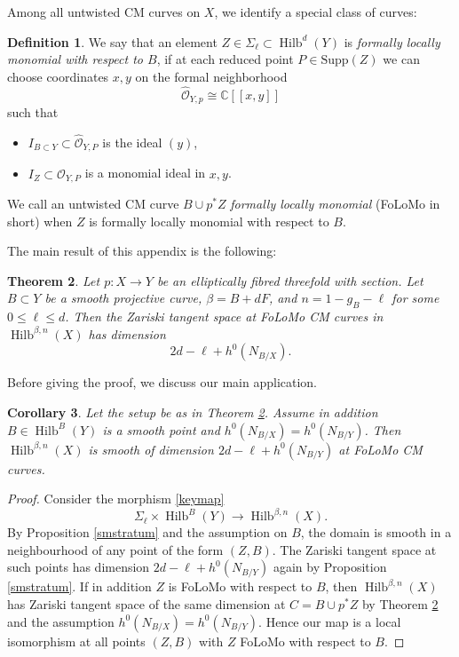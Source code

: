 \documentclass{amsart}
\newtheorem{theorem}{Theorem}%
\newtheorem{corollary}[theorem]{Corollary}
\theoremstyle{definition}
\newtheorem{definition}[theorem]{Definition}
\newcommand{\CC} {\mathbb{C}}          %
\renewcommand{\O}{\mathcal{O}}
\newcommand{\Supp}{\mathrm{Supp}}
\newcommand{\Hilb}{\operatorname{Hilb}}
\begin{document}
Among all untwisted CM curves on $X$, we identify a special class of curves:
\begin{definition}
We say that an element $Z \in \Sigma_\ell \subset \Hilb^d(Y)$ is \emph{formally locally monomial with respect to $B$}, if at each reduced point $P \in \Supp(Z)$ we can choose coordinates $x,y$ on the formal neighborhood 
\[
\widehat{\O}_{Y,p} \cong \CC[\![x,y]\!]
\]
such that
\begin{itemize}
\item $I_{B \subset Y} \subset \widehat{\O}_{Y,P}$ is the ideal $(y)$,
\item $I_Z \subset \widehat{\O}_{Y,P}$ is a monomial ideal in $x,y$.
\end{itemize}
We call an untwisted CM curve $B \cup p^*Z$  \emph{formally locally monomial} (FoLoMo in short) when $Z$ is formally locally monomial with respect to $B$. 
\end{definition}

The main result of this appendix is the following:
\begin{theorem} \label{FoLoMoCM}
Let $p : X \rightarrow Y$ be an elliptically fibred threefold with section. Let $B \subset Y$ be a smooth projective curve, $\beta = B + dF$, and $n = 1-g_B - \ell$ for some $0 \leq \ell \leq d$. Then the Zariski tangent space at FoLoMo CM curves in $\Hilb^{\beta,n}(X)$ has dimension
\[
2d-\ell+h^0(N_{B/X}).
\]
\end{theorem}

Before giving the proof, we discuss our main application. 
\begin{corollary}
Let the setup be as in Theorem \ref{FoLoMoCM}. Assume in addition $B \in \Hilb^B(Y)$ is a smooth point and $h^0(N_{B/X}) = h^0(N_{B/Y})$. Then $\Hilb^{\beta,n}(X)$ is smooth of dimension $2d - \ell + h^0(N_{B/Y})$ at FoLoMo CM curves. 
\end{corollary}
\begin{proof}
Consider the morphism \eqref{keymap}
\[
\Sigma_\ell \times \Hilb^B(Y) \rightarrow \Hilb^{\beta,n}(X).
\]
By Proposition \ref{smstratum} and the assumption on $B$, the domain is smooth in a neighbourhood of any point of the form $(Z,B)$. The Zariski tangent space at such points has dimension $2d - \ell + h^0(N_{B/Y})$ again by Proposition \ref{smstratum}. If in addition $Z$ is FoLoMo with respect to $B$, then $\Hilb^{\beta,n}(X)$ has Zariski tangent space of the same dimension at $C = B \cup p^*Z$ by Theorem \ref{FoLoMoCM} and the assumption $h^0(N_{B/X}) = h^0(N_{B/Y})$. Hence our map is a local isomorphism at all points $(Z,B)$ with $Z$ FoLoMo with respect to $B$.
\end{proof}
\end{document}
